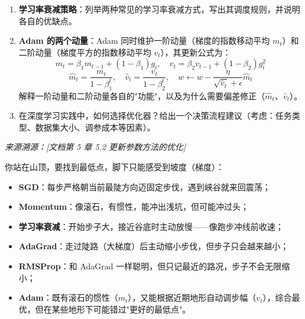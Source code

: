\documentclass[a4paper,11pt]{ctexart}
\begin{document}
\begin{problembox}
\begin{enumerate}[(1)]
        \item \textbf{学习率衰减策略}：列举两种常见的学习率衰减方式，写出其调度规则，并说明各自的优缺点。

        \item \textbf{Adam 的两个动量}：Adam 同时维护一阶动量（梯度的指数移动平均 $m_t$）和二阶动量（梯度平方的指数移动平均 $v_t$），其更新公式为：
        \[
        m_t = \beta_1 m_{t-1} + (1-\beta_1) g_t, \quad v_t = \beta_2 v_{t-1} + (1-\beta_2) g_t^2
        \]
        \[
        \hat{m}_t = \frac{m_t}{1-\beta_1^t}, \quad \hat{v}_t = \frac{v_t}{1-\beta_2^t}, \quad w \leftarrow w - \frac{\eta}{\sqrt{\hat{v}_t}+\epsilon}\hat{m}_t
        \]
        解释一阶动量和二阶动量各自的"功能"，以及为什么需要偏差修正（$\hat{m}_t$、$\hat{v}_t$）。

        \item 在深度学习实践中，如何选择优化器？给出一个决策流程建议（考虑：任务类型、数据集大小、调参成本等因素）。
    \end{enumerate}

    \vspace{0.2cm}
    {\color{gray}\small\textit{来源溯源：[文档第 5 章 5.2 更新参数方法的优化]}}
\end{problembox}

\begin{metaphorbox}
    你站在山顶，要找到最低点，脚下只能感受到坡度（梯度）：
    \begin{itemize}
        \item \textbf{SGD}：每步严格朝当前最陡方向迈固定步伐，遇到峡谷就来回震荡；
        \item \textbf{Momentum}：像滚石，有惯性，能冲出浅坑，但可能冲过头；
        \item \textbf{学习率衰减}：开始步子大，接近谷底时主动放慢——像跑步冲线前收速；
        \item \textbf{AdaGrad}：走过陡路（大梯度）后主动缩小步伐，但步子只会越来越小；
        \item \textbf{RMSProp}：和 AdaGrad 一样聪明，但只记最近的路况，步子不会无限缩小；
        \item \textbf{Adam}：既有滚石的惯性（$m_t$），又能根据近期地形自动调步幅（$v_t$），综合最优，但在某些地形下可能错过"更好的最低点"。
    \end{itemize}
\end{metaphorbox}
\end{document}
